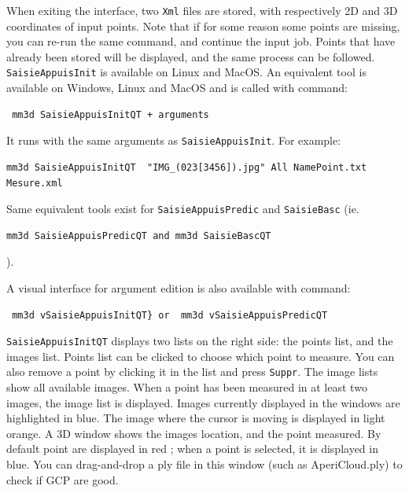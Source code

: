 When exiting the interface, two {\tt Xml} files are stored, with respectively 2D and 3D coordinates of input points.
Note that if for some reason some points are missing, you can re-run the same command, and continue the input job.
Points that have already been stored will be displayed, and the same process can be followed.\\

{\tt SaisieAppuisInit} is available on Linux and MacOS.
An equivalent tool is available on Windows, Linux and MacOS and is called with command: \begin{verbatim} mm3d SaisieAppuisInitQT + arguments \end{verbatim}
It runs with the same arguments as {\tt SaisieAppuisInit}. For example:
\begin{verbatim}
mm3d SaisieAppuisInitQT  "IMG_(023[3456]).jpg" All NamePoint.txt  Mesure.xml
\end{verbatim}

Same equivalent tools exist for {\tt SaisieAppuisPredic} and {\tt SaisieBasc} (ie. \begin{verbatim}mm3d SaisieAppuisPredicQT and mm3d SaisieBascQT\end{verbatim} ).

A visual interface for argument edition is also available with command: \begin{verbatim} mm3d vSaisieAppuisInitQT} or  mm3d vSaisieAppuisPredicQT \end{verbatim}

{\tt SaisieAppuisInitQT} displays two lists on the right side: the points list, and the images list. Points list can be clicked to choose which point to measure. You can also remove a point by clicking it in the list and press {\tt Suppr}.
The image lists show all available images. When a point has been measured in at least two images, the image list is displayed.
Images currently displayed in the windows are highlighted in blue. The image where the cursor is moving is displayed in light orange.
A 3D window shows the images location, and the point measured. By default point are displayed in red ; when a point is selected, it is displayed in blue.
You can drag-and-drop a ply file in this window (such as AperiCloud.ply) to check if GCP are good.

